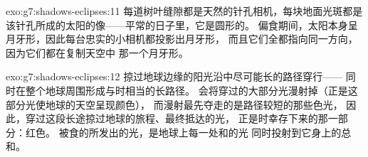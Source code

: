 \begin{solution}{exo:g7:shadows-eclipses:11}
每道树叶缝隙都是天然的针孔相机，每块地面光斑都是
该针孔所成的太阳的像——平常的日子里，它是圆形的。
偏食期间，太阳本身呈月牙形，因此每台忠实的小相机都投影出月牙形，
而且它们全都指向同一方向，因为它们都在复制天空中
那一个月牙形。
\end{solution}

\begin{solution}{exo:g7:shadows-eclipses:12}
掠过地球边缘的阳光沿中尽可能长的路径穿行——
同时在整个地球周围形成与时相当的长路径。
会将穿过的大部分光漫射掉（正是这部分光使地球的天空呈现颜色），
而漫射最先夺走的是路径较短的那些色光，
因此，穿过这段长途掠过地球的旅程、最终抵达的光，
正是时幸存下来的那一部分：红色。
被食的所发出的光，是地球上每一处和的光
同时投射到它身上的总和。
\end{solution}

